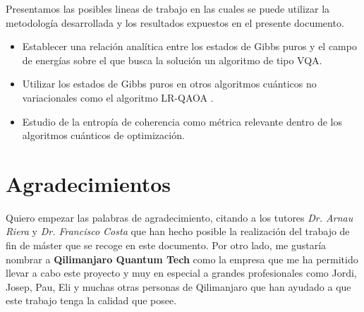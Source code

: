 Presentamos las posibles lineas de trabajo en las cuales se puede utilizar la metodología desarrollada y los resultados expuestos en el presente documento.

\begin{itemize}
    
\item Establecer una relación analítica entre los estados de Gibbs puros y el campo de energías sobre el que busca la solución un algoritmo de tipo VQA.

\item Utilizar los estados de Gibbs puros en otros algoritmos cuánticos no variacionales como el algoritmo LR-QAOA \citep{montañez}.

\item Estudio de la entropía de coherencia como métrica relevante dentro de los algoritmos cuánticos de optimización.
    
\end{itemize}


\section{Agradecimientos}

Quiero empezar las palabras de agradecimiento, citando a los tutores \textit{Dr. Arnau Riera} y \textit{Dr. Francisco Costa} que han hecho posible la realización del trabajo de fin de máster que se recoge en este documento. Por otro lado, me gustaría nombrar a  \textbf{Qilimanjaro Quantum Tech} como la empresa que me ha permitido llevar a cabo este proyecto y muy en especial a grandes profesionales como Jordi, Josep, Pau, Eli y muchas otras personas de Qilimanjaro que han ayudado a que este trabajo tenga la calidad que posee.